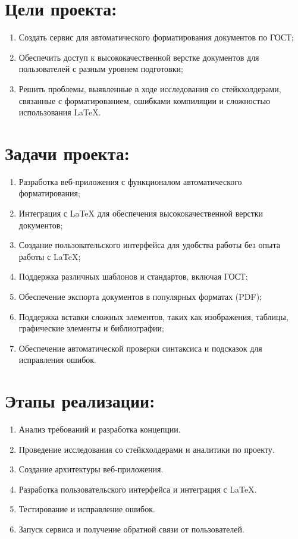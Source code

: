 \documentclass[a4paper,12pt]{article}
\begin{document}
\section{Цели проекта:}
  \begin{enumerate}
    \item Создать сервис для автоматического форматирования документов по ГОСТ;
    \item Обеспечить доступ к высококачественной верстке документов для пользователей с разным уровнем подготовки;
    \item Решить проблемы, выявленные в ходе исследования со стейкхолдерами, связанные с форматированием, ошибками компиляции и сложностью использования LaTeX.
\end{enumerate}

\section{Задачи проекта:}
 \begin{enumerate}
    \item Разработка веб-приложения с функционалом автоматического форматирования;
    \item Интеграция с LaTeX для обеспечения высококачественной верстки документов;
    \item Создание пользовательского интерфейса для удобства работы без опыта работы с LaTeX;
    \item Поддержка различных шаблонов и стандартов, включая ГОСТ;
    \item Обеспечение экспорта документов в популярных форматах (PDF);
    \item Поддержка вставки сложных элементов, таких как изображения, таблицы, графические элементы и библиографии;
    \item Обеспечение автоматической проверки синтаксиса и подсказок для исправления ошибок.
 \end{enumerate}

 \section{Этапы реализации:}
 \begin{enumerate}
    \item Анализ требований и разработка концепции.
    \item Проведение исследования со стейкхолдерами и аналитики по проекту.
    \item Создание архитектуры веб-приложения.
    \item Разработка пользовательского интерфейса и интеграция с LaTeX.
    \item Тестирование и исправление ошибок.
    \item Запуск сервиса и получение обратной связи от пользователей.
    
 \end{enumerate}
 
\end{document}
